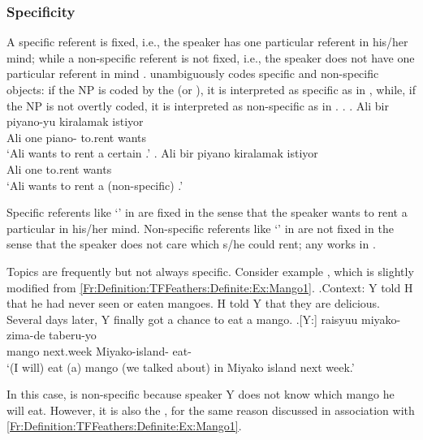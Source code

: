 \subsubsection{Specificity}

A specific referent is fixed, i.e., the speaker has one particular referent in his/her mind;
while a non-specific referent is not fixed,
i.e., the speaker does not have one particular referent in mind \cite{karttunen69diss,enc91,abbott94}.
 unambiguously codes specific and non-specific objects:
if the NP is coded by the    (or ),
it is interpreted as specific as in \Next[a],
while, if the NP is not overtly coded,
it is interpreted as non-specific as in \Next[b].
\ex. \ag. Ali bir piyano-yu kiralamak istiyor \\
	Ali one piano- to.rent wants \\
	`Ali wants to rent a certain .'
	\bg. Ali bir piyano kiralamak istiyor \\
	Ali one  to.rent wants \\
	`Ali wants to rent a (non-specific) .'
	\hfill{\cite[][p.\ 4-5]{enc91}}

Specific referents like `' in \Last[a] are fixed
in the sense that
the speaker wants to rent a particular  in his/her mind.
Non-specific referents like `' in \Last[b] are not fixed
in the sense that
the speaker does not care which  s/he could rent;
any  works in \Last[b].

Topics are frequently but not always specific.
Consider example \Next,
which is slightly modified from \ref{Fr:Definition:TFFeathers:Definite:Ex:Mango1}.
%
\ex.\label{Fr:Definition:TFFeathers:Specificity:Mango}Context:
	Y told H that he had never seen or eaten mangoes.
	H told Y that they are delicious.
	Several days later, Y finally got a chance to eat a mango.
	\ag.[Y:]  raisyuu miyako-zima-de taberu-yo \\
			mango next.week Miyako-island- eat- \\
			`(I will) eat (a) mango (we talked about) in Miyako island next week.'

In this case,  is non-specific because speaker Y does not know which mango he will eat.
However, it is also the , for the same reason discussed in association with \ref{Fr:Definition:TFFeathers:Definite:Ex:Mango1}.


